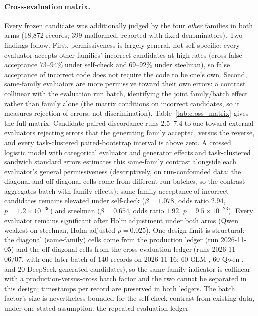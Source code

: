 \documentclass[a4paper,journal]{IAENGtran}
\begin{document}
\paragraph{Cross-evaluation matrix.} Every frozen candidate was additionally judged by
the four \emph{other} families in both arms (18,872 records; 399 malformed, reported
with fixed denominators). Two findings follow. First, permissiveness is largely
general, not self-specific: every evaluator accepts other families' incorrect
candidates at high rates (cross false acceptance $73$--$94\%$ under self-check and
$69$--$92\%$ under steelman), so false acceptance of incorrect code does not require
the code to be one's own. Second, same-family evaluators are more permissive toward their own errors: a
contrast collinear with the evaluation run batch, identifying the joint
family/batch effect rather than family alone
(the matrix conditions on incorrect candidates, so it measures rejection of
errors, not discrimination).
Table~\ref{tab:cross_matrix} gives the full matrix. Candidate-paired discordance runs
$2.5$--$7.4$ to one toward external evaluators rejecting errors that the generating
family accepted, versus the reverse, and every task-clustered
paired-bootstrap interval is above zero. A crossed logistic model with categorical
evaluator and generator effects and task-clustered sandwich standard errors estimates
this same-family contrast alongside each evaluator's general permissiveness
(descriptively, on run-confounded data: the diagonal and off-diagonal cells come
from different run batches, so the contrast aggregates batch with family effects):
same-family
acceptance of incorrect candidates remains elevated under self-check
($\beta=1.078$, odds ratio $2.94$, $p=1.2\times10^{-36}$) and steelman
($\beta=0.654$, odds ratio $1.92$, $p=9.5\times10^{-23}$). Every
evaluator remains significant after Holm adjustment under both arms (Qwen weakest on
steelman, Holm-adjusted $p=0.025$). One design limit is structural: the diagonal
(same-family) cells come from the production ledger (run 2026-11-05) and the
off-diagonal cells from the cross-evaluation ledger (runs 2026-11-06/07, with one
later batch of $140$ records on 2026-11-16: $60$ GLM-, $60$ Qwen-, and $20$
DeepSeek-generated candidates), so the
same-family indicator is collinear with a production-versus-cross batch factor and the
two cannot be separated in this design; timestamps per record are preserved in both
ledgers. The batch factor's size is nevertheless bounded for the self-check contrast
from existing data, under one stated assumption: the repeated-evaluation ledger
\end{document}
